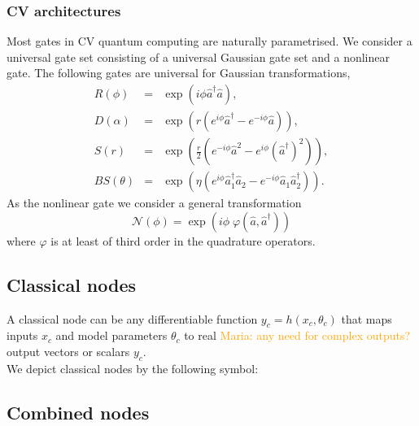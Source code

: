 \documentclass[aps,pra,10pt,twocolumn,groupedaddress,nofootinbib]{revtex4-1}
\theoremstyle{plain}
\renewcommand{\a}{\hat{a}}
\newcommand{\adag}{\hat{a}^{\dagger}}
\newcommand{\maria}[1]{\textcolor{orange}{Maria: #1}}
\begin{document}
\subsubsection{CV architectures}

Most gates in CV quantum computing are naturally parametrised. We consider a universal gate set consisting of a universal Gaussian gate set and a nonlinear gate. The following gates are universal for Gaussian transformations, 
\begin{eqnarray}
  	R(\phi) & =& \exp\left(i \phi \adag \a \right), \\
  	D(\alpha) & =& \exp(r (e^{i\phi} \adag -e^{-i\phi} \a)), \\
  	S(r) & =& \exp \left(\frac{r}{2} \left(e^{-i\phi} \a^2 -e^{i\phi}  (\adag)^2 \right) \right), \\
  	BS(\theta) & =& \exp\left(\eta (e^{i \phi} \adag_1 \a_2 -e^{-i \phi}\a_1 \adag_2) \right).
  \label{Eq:gaussiangates}
\end{eqnarray}
As the nonlinear gate we consider a general transformation
\begin{equation}
	\mathcal{N}(\phi) = \exp(i \phi \; \varphi(\a, \adag))
	\label{Eq:nonlineargate}
\end{equation}
where $\varphi$ is at least of third order in the quadrature operators. 

\subsection{Classical nodes}

A classical node can be any differentiable function $y_c = h(x_c, \theta_c)$ that maps inputs $x_c$ and model parameters $\theta_c$ to real \maria{any need for complex outputs?} output vectors or scalars $y_c$.\\

We depict classical nodes by the following symbol:\\
\begin{figure}[h]
\centering
{}
\end{figure}
 


\subsection{Combined nodes}
\end{document}
